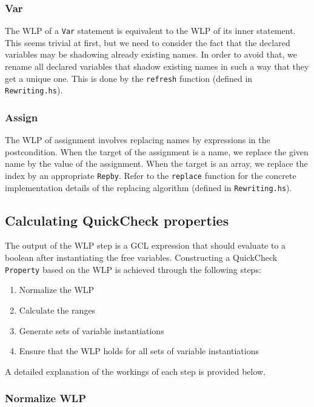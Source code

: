 \documentclass[a4paper]{article}
\begin{document}
\subsubsection*{Var}

The WLP of a \texttt{Var} statement is equivalent to the WLP of its inner statement.
This seems trivial at first, but we need to consider the fact that the declared
variables may be shadowing already existing names. In order to avoid that, we
rename all declared variables that shadow existing names in such a way that they get
a unique one. This is done by the \texttt{refresh} function (defined in \texttt{Rewriting.hs}).


\subsubsection*{Assign}

The WLP of assignment involves replacing names by expressions in the postcondition.
When the target of the assignment is a name, we replace the given name by the value
of the assignment. When the target is an array, we replace the index by an appropriate
\texttt{Repby}. Refer to the \texttt{replace} function for the concrete implementation
details of the replacing algorithm (defined in \texttt{Rewriting.hs}).

\subsection{Calculating QuickCheck properties}

The output of the WLP step is a GCL expression that should evaluate to a boolean
after instantiating the free variables. Constructing a QuickCheck \texttt{Property}
based on the WLP is achieved through the following steps:

\begin{enumerate}
\item Normalize the WLP
\item Calculate the ranges
\item Generate sets of variable instantiations
\item Ensure that the WLP holds for all sets of variable instantiations
\end{enumerate}

A detailed explanation of the workings of each step is provided below.

\subsubsection*{Normalize WLP}
\end{document}
